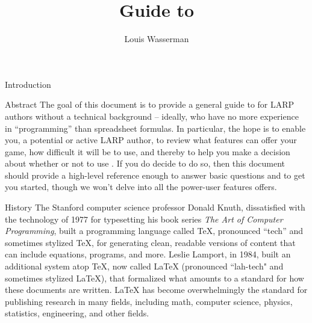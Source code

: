 \documentclass[sheet]{GameTexBase}
\title{Guide to \gametex{}}
\author{Louis Wasserman}
\begin{document}
\maketitle{}
\setcounter{tocdepth}{2}
\tableofcontents
\begin{section}{Introduction}
\begin{subsection}{Abstract}
The goal of this document is to provide a general guide to \gametex{} for LARP authors without a technical background -- ideally, who have no more experience in ``programming'' than spreadsheet formulas.  In particular, the hope is to enable you, a potential or active LARP author, to review what features \gametex{} can offer your game, how difficult it will be to use, and thereby to help you make a decision about whether or not to use \gametex{}.  If you do decide to do so, then this document should provide a high-level reference enough to answer basic questions and to get you started, though we won't delve into all the power-user features \gametex{} offers.

\end{subsection}
\begin{subsection}{History}
The Stanford computer science professor Donald Knuth, dissatisfied with the technology of 1977 for typesetting his book series \textit{The Art of Computer Programming}, built a programming language called TeX,
pronounced ``tech'' and sometimes stylized \TeX{}, for generating clean, readable versions of content that can include equations, programs, and more. 
Leslie Lamport, in 1984, built an additional system atop \TeX{}, now called LaTeX (pronounced ``lah-tech" and sometimes stylized \LaTeX{}), that formalized what amounts to a standard for how these documents are written.  LaTeX has become overwhelmingly the standard for publishing research in many fields, including math, computer science, physics, statistics, engineering, and other fields.


\end{subsection}
\end{section}
\end{document}
